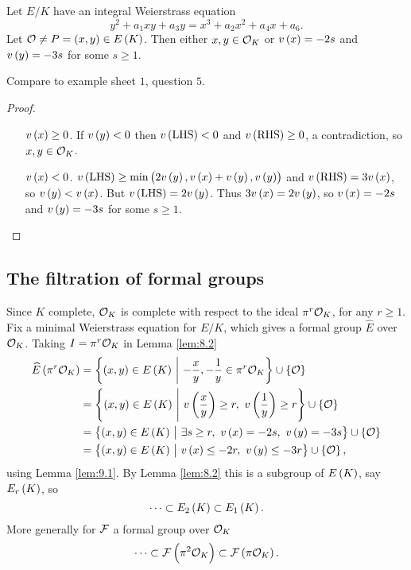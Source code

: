 \begin{lemma}
\label{lem:9.1}
Let $ E / K $ have an integral Weierstrass equation
$$ y^2 + a_1xy + a_3y = x^3 + a_2x^2 + a_4x + a_6. $$
Let $ \OOO \ne P = \br{x, y} \in E\br{K} $. Then either $ x, y \in \mathcal{O}_K $ or $ v\br{x} = -2s $ and $ v\br{y} = -3s $ for some $ s \ge 1 $.
\end{lemma}

Compare to example sheet $ 1 $, question $ 5 $.

\begin{proof}
\hfill
\begin{itemize}[leftmargin=0.5in]
\item[$ v\br{x} \ge 0 $.] If $ v\br{y} < 0 $ then $ v\br{\text{LHS}} < 0 $ and $ v\br{\text{RHS}} \ge 0 $, a contradiction, so $ x, y \in \mathcal{O}_K $.
\item[$ v\br{x} < 0 $.] $ v\br{\text{LHS}} \ge \min\br{2v\br{y}, v\br{x} + v\br{y}, v\br{y}} $ and $ v\br{\text{RHS}} = 3v\br{x} $, so $ v\br{y} < v\br{x} $. But $ v\br{\text{LHS}} = 2v\br{y} $. Thus $ 3v\br{x} = 2v\br{y} $, so $ v\br{x} = -2s $ and $ v\br{y} = -3s $ for some $ s \ge 1 $.
\end{itemize}
\end{proof}

\subsection{The filtration of formal groups}

Since $ K $ complete, $ \mathcal{O}_K $ is complete with respect to the ideal $ \pi^r\mathcal{O}_K $, for any $ r \ge 1 $. Fix a minimal Weierstrass equation for $ E / K $, which gives a formal group $ \widehat{E} $ over $ \mathcal{O}_K $. Taking $ I = \pi^r\mathcal{O}_K $ in Lemma \ref{lem:8.2}
\begin{align*}
\widehat{E}\br{\pi^r\OOO_K}
& = \cbr{\br{x, y} \in E\br{K} \st -\dfrac{x}{y}, -\dfrac{1}{y} \in \pi^r\OOO_K} \cup \cbr{\OOO} \\
& = \cbr{\br{x, y} \in E\br{K} \st v\br{\dfrac{x}{y}} \ge r, \ v\br{\dfrac{1}{y}} \ge r} \cup \cbr{\OOO} \\
& = \cbr{\br{x, y} \in E\br{K} \st \exists s \ge r, \ v\br{x} = -2s, \ v\br{y} = -3s} \cup \cbr{\OOO} \\
& = \cbr{\br{x, y} \in E\br{K} \st v\br{x} \le -2r, \ v\br{y} \le -3r} \cup \cbr{\OOO},
\end{align*}
using Lemma \ref{lem:9.1}. By Lemma \ref{lem:8.2} this is a subgroup of $ E\br{K} $, say $ E_r\br{K} $, so
$$ \dots \subset E_2\br{K} \subset E_1\br{K}. $$
More generally for $ \mathcal{F} $ a formal group over $ \mathcal{O}_K $
$$ \dots \subset \FFF\br{\pi^2\OOO_K} \subset \FFF\br{\pi\OOO_K}. $$

